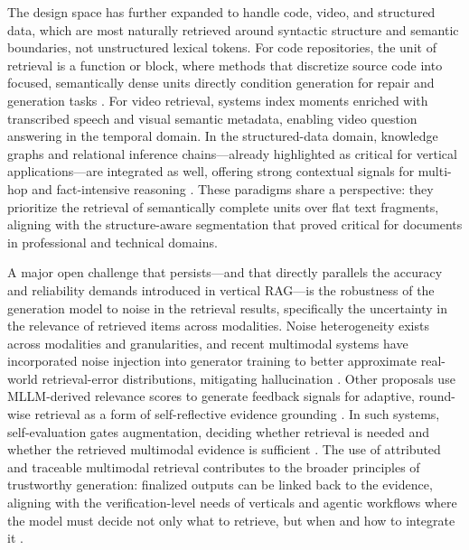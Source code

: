 \documentclass[11pt,a4paper]{article}
\begin{document}
The design space has further expanded to handle code, video, and structured data, which are most naturally retrieved around syntactic structure and semantic boundaries, not unstructured lexical tokens. For code repositories, the unit of retrieval is a function or block, where methods that discretize source code into focused, semantically dense units directly condition generation for repair and generation tasks \cite{arxiv:2402.06196v2}. For video retrieval, systems index moments enriched with transcribed speech and visual semantic metadata, enabling video question answering in the temporal domain. In the structured-data domain, knowledge graphs and relational inference chains---already highlighted as critical for vertical applications---are integrated as well, offering strong contextual signals for multi-hop and fact-intensive reasoning \cite{arxiv:2408.08921v2}. These paradigms share a perspective: they prioritize the retrieval of semantically complete units over flat text fragments, aligning with the structure-aware segmentation that proved critical for documents in professional and technical domains.

A major open challenge that persists---and that directly parallels the accuracy and reliability demands introduced in vertical RAG---is the robustness of the generation model to noise in the retrieval results, specifically the uncertainty in the relevance of retrieved items across modalities. Noise heterogeneity exists across modalities and granularities, and recent multimodal systems have incorporated noise injection into generator training to better approximate real-world retrieval-error distributions, mitigating hallucination \cite{arxiv:2401.02412v1}. Other proposals use MLLM-derived relevance scores to generate feedback signals for adaptive, round-wise retrieval as a form of self-reflective evidence grounding \cite{arxiv:2310.11511v1}. In such systems, self-evaluation gates augmentation, deciding whether retrieval is needed and whether the retrieved multimodal evidence is sufficient \cite{arxiv:2212.10511v4}. The use of attributed and traceable multimodal retrieval contributes to the broader principles of trustworthy generation: finalized outputs can be linked back to the evidence, aligning with the verification-level needs of verticals and agentic workflows where the model must decide not only what to retrieve, but when and how to integrate it \cite{arxiv:2403.03187v1}.
\end{document}
